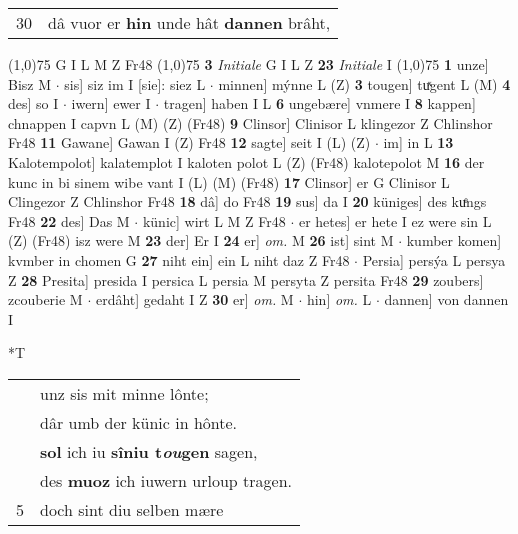 \documentclass[8pt,a4paper,notitlepage]{article}
\begin{document}
\begin{table}[ht]
\begin{minipage}[t]{0.5\linewidth}
\begin{tabular}{rl}
30 & dâ vuor er \textbf{hin} unde hât \textbf{dannen} brâht,\\ 
\end{tabular}
\scriptsize
\line(1,0){75} \newline
G I L M Z Fr48 \newline
\line(1,0){75} \newline
\textbf{3} \textit{Initiale} G I L Z  \textbf{23} \textit{Initiale} I  \newline
\line(1,0){75} \newline
\textbf{1} unze] Bisz M  $\cdot$ sis] siz im I [sie]: siez L  $\cdot$ minnen] mýnne L (Z) \textbf{3} tougen] tuͯgent L (M) \textbf{4} des] so I  $\cdot$ iwern] ewer I  $\cdot$ tragen] haben I L \textbf{6} ungebære] vnmere I \textbf{8} kappen] chnappen I capvn L (M) (Z) (Fr48) \textbf{9} Clinsor] Clinisor L klingezor Z Chlinshor Fr48 \textbf{11} Gawane] Gawan I (Z) Fr48 \textbf{12} sagte] seit I (L) (Z)  $\cdot$ im] in L \textbf{13} Kalotempolot] kalatemplot I kaloten polot L (Z) (Fr48) kalotepolot M \textbf{16} der kunc in bi sinem wibe vant I (L) (M) (Fr48) \textbf{17} Clinsor] er G Clinisor L Clingezor Z Chlinshor Fr48 \textbf{18} dâ] do Fr48 \textbf{19} sus] da I \textbf{20} küniges] des kuͤngs Fr48 \textbf{22} des] Das M  $\cdot$ künic] wirt L M Z Fr48  $\cdot$ er hetes] er hete I ez were sin L (Z) (Fr48) isz were M \textbf{23} der] Er I \textbf{24} er] \textit{om.} M \textbf{26} ist] sint M  $\cdot$ kumber komen] kvmber in chomen G \textbf{27} niht ein] ein L niht daz Z Fr48  $\cdot$ Persia] persýa L persya Z \textbf{28} Presita] presida I persica L persia M persyta Z persita Fr48 \textbf{29} zoubers] zcouberie M  $\cdot$ erdâht] gedaht I Z \textbf{30} er] \textit{om.} M  $\cdot$ hin] \textit{om.} L  $\cdot$ dannen] von dannen I \newline
\end{minipage}
\hspace{0.5cm}
\begin{minipage}[t]{0.5\linewidth}
\small
\begin{center}*T
\end{center}
\begin{tabular}{rl}
 & unz sis mit minne lônte;\\ 
 & dâr umb der künic in hônte.\\ 
 & \textbf{sol} ich iu \textbf{sîniu t\textit{ou}gen} sagen,\\ 
 & des \textbf{muoz} ich iuwern urloup tragen.\\ 
5 & doch sint diu selben mære\\ 

\end{tabular}
\end{minipage}
\end{table}
\end{document}
